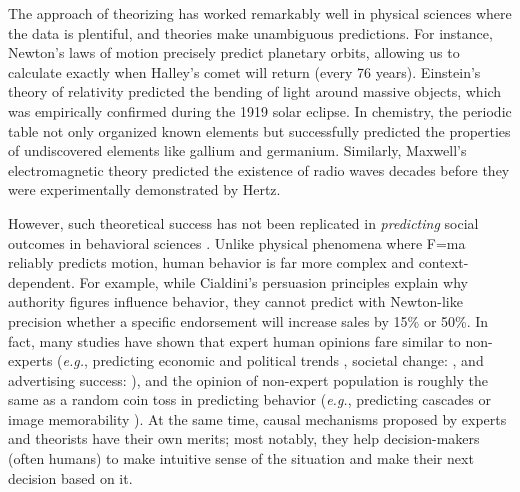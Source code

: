 The approach of theorizing has worked remarkably well in physical sciences where the data is plentiful, and theories make unambiguous predictions. For instance, Newton's laws of motion precisely predict planetary orbits, allowing us to calculate exactly when Halley's comet will return (every 76 years). Einstein's theory of relativity predicted the bending of light around massive objects, which was empirically confirmed during the 1919 solar eclipse. In chemistry, the periodic table not only organized known elements but successfully predicted the properties of undiscovered elements like gallium and germanium. Similarly, Maxwell's electromagnetic theory predicted the existence of radio waves decades before they were experimentally demonstrated by Hertz.


However, such theoretical success has not been replicated in \textit{predicting} social outcomes in behavioral sciences \cite{open2015estimating,tetlock2017expert,forecasting2023insights}. Unlike physical phenomena where F=ma reliably predicts motion, human behavior is far more complex and context-dependent. For example, while Cialdini's persuasion principles explain why authority figures influence behavior, they cannot predict with Newton-like precision whether a specific endorsement will increase sales by 15\% or 50\%. In fact, many studies have shown that expert human opinions fare similar to non-experts (\textit{e.g.}, predicting economic and political trends \cite{tetlock2017expert}, societal change: \cite{forecasting2023insights}, and advertising success: \cite{singh2024measuring}), and the opinion of non-expert population is roughly the same as a random coin toss in predicting behavior (\textit{e.g.}, predicting cascades \cite{tan2014effect} or image memorability \cite{isola2013makes}). At the same time, causal mechanisms proposed by experts and theorists have their own merits; most notably, they help decision-makers (often humans) to make intuitive sense of the situation and make their next decision based on it. 


